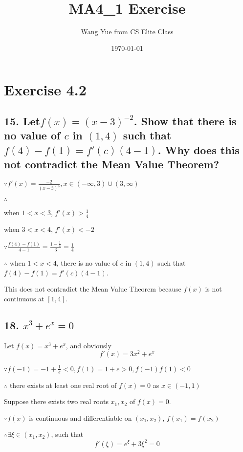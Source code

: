 \documentclass{article}
\begin{document}
    \title{MA4\_1 Exercise}
    \author{Wang Yue from CS Elite Class}
    \date{\today}

    \maketitle

    \section*{Exercise 4.2}

    \subsection*{15. Let$f(x) = (x - 3)^{-2}$. Show that there is no value of $c$ in $(1, 4)$ such that $f(4) - f(1) = f'(c)(4 - 1)$. Why does this not contradict the Mean Value Theorem?}

    $\because f'(x) = \frac{-2}{(x - 3)^3}, x \in (-\infty, 3) \cup (3, \infty)$

    $\therefore$ 
    
    when $1 < x < 3$, $f'(x) > \frac 1 4$

    when $3 < x < 4$, $f'(x) < -2$

    $\because \frac{f(4) - f(1)}{4 - 1} = \frac{1 - \frac 1 4}{3} = \frac 1 4$

    $\therefore $ when $1 < x < 4$, there is no value of $c$ in $(1, 4)$ such that $f(4) - f(1) = f'(c)(4 - 1)$.

    This does not contradict the Mean Value Theorem because $f(x)$ is not continuous at $[1, 4]$.

    \subsection*{18. $x^3 + e^x = 0$}

    Let $f(x) = x^3 + e^x$, and obviously $$f'(x) = 3x^2 + e^x$$

    $\because f(-1) = -1 + \frac 1 e < 0, f(1) = 1 + e > 0, f(-1)f(1) < 0$

    $\therefore$ there exists at least one real root of $f(x) = 0$ as $x \in (-1, 1)$

    Suppose there exists two real roots $x_1, x_2$ of $f(x) = 0$.

    $\because f(x)$ is continuous and differentiable on $(x_1, x_2)$, $f(x_1) = f(x_2)$

    $\therefore \exists \xi \in (x_1, x_2)$, such that $$f'(\xi) = e^{\xi} + 3\xi ^2 = 0$$
\end{document}
